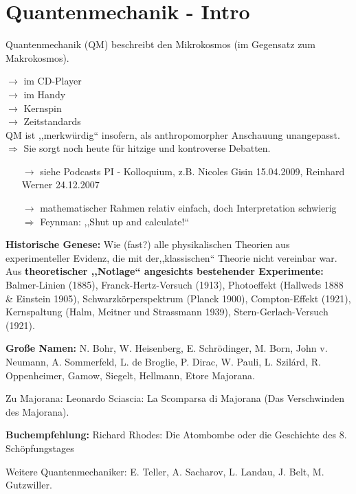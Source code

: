 \chapter{Quantenmechanik - Intro}

Quantenmechanik (QM) beschreibt den Mikrokosmos (im Gegensatz zum Makrokosmos).

\noindent
$ \rightarrow $ im CD-Player\\
$ \rightarrow $ im Handy\\
$ \rightarrow $ Kernspin\\
$ \rightarrow $ Zeitstandards\\

\noindent
QM ist ,,merkwürdig`` insofern, als anthropomorpher Anschauung unangepasst. $ \Rightarrow $ Sie sorgt noch heute für hitzige und kontroverse Debatten.

\begin{itemize}
	\item[$ \rightarrow $] siehe Podcasts PI - Kolloquium, z.B. Nicoles Gisin 15.04.2009, Reinhard Werner 24.12.2007
	\item[$ \rightarrow $] mathematischer Rahmen relativ einfach, doch Interpretation schwierig\\
	$ \Rightarrow $ Feynman: ,,Shut up and calculate{!}``
\end{itemize}
\textbf{Historische Genese:} Wie (fast?) alle physikalischen Theorien aus experimenteller Evidenz, die mit der,,klassischen`` Theorie nicht vereinbar war.\\[5pt]
Aus \textbf{theoretischer ,,Notlage`` angesichts bestehender Experimente:}\\
Balmer-Linien (1885), Franck-Hertz-Versuch (1913), Photoeffekt (Hallweds 1888 \& Einstein 1905), Schwarzkörperspektrum (Planck 1900), Compton-Effekt (1921), Kernspaltung (Halm, Meitner und Strassmann 1939), Stern-Gerlach-Versuch (1921).\par
\textbf{Große Namen:} N. Bohr, W. Heisenberg, E. Schrödinger, M. Born, John v. Neumann, A. Sommerfeld, L. de Broglie, P. Dirac, W. Pauli, L. Szil\'ard, R. Oppenheimer, Gamow, Siegelt, Hellmann, Etore Majorana.\par
Zu Majorana: Leonardo Sciascia: La Scomparsa di Majorana (Das Verschwinden des Majorana).\par
\textbf{Buchempfehlung:} Richard Rhodes: Die Atombombe oder die Geschichte des 8. Schöpfungstages\par
Weitere Quantenmechaniker: E. Teller, A. Sacharov, L. Landau, J. Belt, M. Gutzwiller.\\[10pt]

